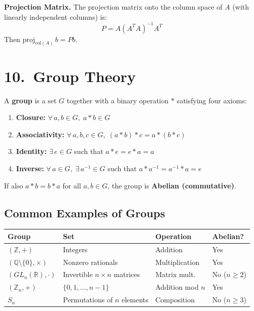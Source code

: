 \documentclass[12pt]{article}
\begin{document}
\begin{formulabox}
\textbf{Projection Matrix.} The projection matrix onto the column space of $A$ (with linearly independent columns) is:
\[
P = A(A^TA)^{-1}A^T
\]
Then $\text{proj}_{\text{col}(A)}\,b = Pb$.
\end{formulabox}

\section{10.\ Group Theory}

\begin{defbox}[Group]
A \textbf{group} is a set $G$ together with a binary operation $*$ satisfying four axioms:
\begin{enumerate}[leftmargin=18pt, itemsep=4pt]
  \item \textbf{Closure:} $\forall\, a,b \in G,\; a*b \in G$
  \item \textbf{Associativity:} $\forall\, a,b,c \in G,\; (a*b)*c = a*(b*c)$
  \item \textbf{Identity:} $\exists\, e \in G$ such that $a*e = e*a = a$
  \item \textbf{Inverse:} $\forall\, a \in G,\; \exists\, a^{-1} \in G$ such that $a*a^{-1} = a^{-1}*a = e$
\end{enumerate}
If also $a*b = b*a$ for all $a,b \in G$, the group is \textbf{Abelian (commutative)}.
\end{defbox}

\subsection{Common Examples of Groups}

\begin{tcolorbox}[enhanced, colback=lightbg, colframe=primary, arc=4pt, boxrule=1pt]
\begin{tabular}{llll}
\toprule
\textbf{Group} & \textbf{Set} & \textbf{Operation} & \textbf{Abelian?} \\
\midrule
$(\mathbb{Z}, +)$ & Integers & Addition & Yes \\
$(\mathbb{Q}\setminus\{0\}, \times)$ & Nonzero rationals & Multiplication & Yes \\
$(GL_n(\mathbb{R}), \cdot)$ & Invertible $n\times n$ matrices & Matrix mult. & No ($n\geq 2$) \\
$(\mathbb{Z}_n, +)$ & $\{0,1,\ldots,n-1\}$ & Addition mod $n$ & Yes \\
$S_n$ & Permutations of $n$ elements & Composition & No ($n\geq 3$) \\
\bottomrule
\end{tabular}
\end{tcolorbox}
\end{document}
